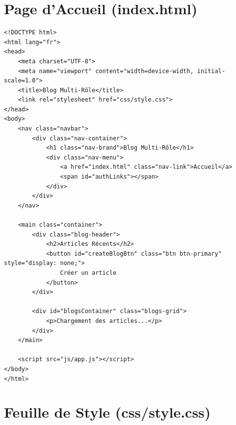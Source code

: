 \section{Page d'Accueil (index.html)}

\begin{lstlisting}[style=html, caption=public/index.html - Page d'accueil]
<!DOCTYPE html>
<html lang="fr">
<head>
    <meta charset="UTF-8">
    <meta name="viewport" content="width=device-width, initial-scale=1.0">
    <title>Blog Multi-Rôle</title>
    <link rel="stylesheet" href="css/style.css">
</head>
<body>
    <nav class="navbar">
        <div class="nav-container">
            <h1 class="nav-brand">Blog Multi-Rôle</h1>
            <div class="nav-menu">
                <a href="index.html" class="nav-link">Accueil</a>
                <span id="authLinks"></span>
            </div>
        </div>
    </nav>
    
    <main class="container">
        <div class="blog-header">
            <h2>Articles Récents</h2>
            <button id="createBlogBtn" class="btn btn-primary" style="display: none;">
                Créer un article
            </button>
        </div>
        
        <div id="blogsContainer" class="blogs-grid">
            <p>Chargement des articles...</p>
        </div>
    </main>
    
    <script src="js/app.js"></script>
</body>
</html>
\end{lstlisting}

\section{Feuille de Style (css/style.css)}

